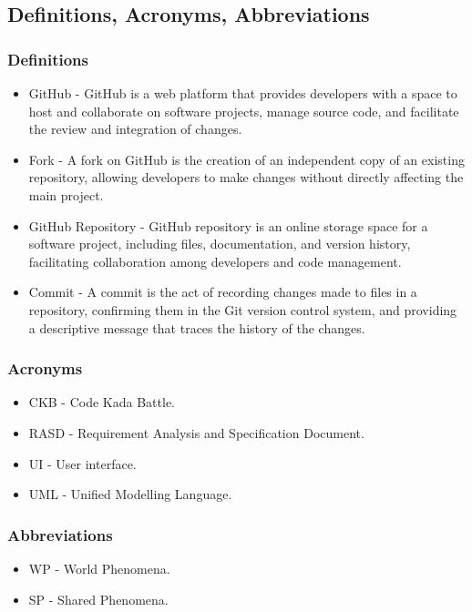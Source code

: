 \subsection{Definitions, Acronyms, Abbreviations}

\subsubsection{Definitions}
\begin{itemize}
    \item GitHub - GitHub is a web platform that provides developers with a space to host and collaborate on software projects, manage source code, and facilitate the review and integration of changes.
    \item Fork - A fork on GitHub is the creation of an independent copy of an existing repository, allowing developers to make changes without directly affecting the main project.
    \item GitHub Repository - GitHub repository is an online storage space for a software project, including files, documentation, and version history, facilitating collaboration among developers and code management.
    \item Commit - A commit is the act of recording changes made to files in a repository, confirming them in the Git version control system, and providing a descriptive message that traces the history of the changes.
\end{itemize}
\subsubsection{Acronyms}
\begin{itemize}
    \item CKB - Code Kada Battle.
    \item RASD - Requirement Analysis and Specification Document. 
    \item UI - User interface. 
    \item UML - Unified Modelling Language.
\end{itemize}
\subsubsection{Abbreviations}
\begin{itemize}
    \item WP - World Phenomena.
    \item SP - Shared Phenomena.
\end{itemize}

